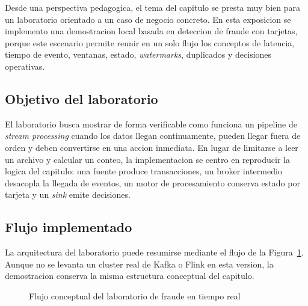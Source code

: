 \documentclass[12pt,a4paper]{article}
\begin{document}
Desde una perspectiva pedagogica, el tema del capitulo se presta muy bien para un laboratorio orientado a un caso de negocio concreto. En esta exposicion se implemento una demostracion local basada en deteccion de fraude con tarjetas, porque este escenario permite reunir en un solo flujo los conceptos de latencia, tiempo de evento, ventanas, estado, \textit{watermarks}, duplicados y decisiones operativas.

\subsection{Objetivo del laboratorio}

El laboratorio busca mostrar de forma verificable como funciona un pipeline de \textit{stream processing} cuando los datos llegan continuamente, pueden llegar fuera de orden y deben convertirse en una accion inmediata. En lugar de limitarse a leer un archivo y calcular un conteo, la implementacion se centro en reproducir la logica del capitulo: una fuente produce transacciones, un broker intermedio desacopla la llegada de eventos, un motor de procesamiento conserva estado por tarjeta y un \textit{sink} emite decisiones.

\subsection{Flujo implementado}

La arquitectura del laboratorio puede resumirse mediante el flujo de la Figura~\ref{fig:lab-flow}. Aunque no se levanta un cluster real de Kafka o Flink en esta version, la demostracion conserva la misma estructura conceptual del capitulo.

\begin{figure}[h]
\centering
{}
\caption{Flujo conceptual del laboratorio de fraude en tiempo real}
\label{fig:lab-flow}
\end{figure}
\end{document}
